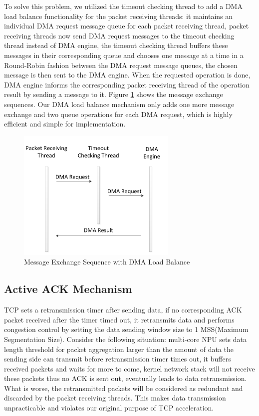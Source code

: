 \documentclass[conference]{IEEEtran}
\begin{document}
To solve this problem, we utilized the timeout checking thread to add a DMA load balance functionality for the packet receiving threads: it maintains an individual DMA request message queue for each packet receiving thread, packet receiving threads now send DMA request messages to the timeout checking thread instead of DMA engine, the timeout checking thread buffers these messages in their corresponding queue and chooses one message at a time in a Round-Robin fashion between the DMA request message queues, the chosen message is then sent to the DMA engine. When the requested operation is done, DMA engine informs the corresponding packet receiving thread of the operation result by sending a message to it. Figure \ref{dma balance seq} shows the message exchange sequences. Our DMA load balance mechanism only adds one more message exchange and two queue operations for each DMA request, which is highly efficient and simple for implementation.
\begin{figure}[!t]
\centering
\includegraphics[width=3.0in]{dma_balance_seq}
\caption{Message Exchange Sequence with DMA Load Balance}
\label{dma balance seq}
\end{figure}
\subsection{Active ACK Mechanism}
TCP sets a retransmission timer after sending data, if no corresponding ACK packet received after the timer timed out, it retransmits data and performs congestion control by setting the data sending window size to 1 MSS(Maximum Segmentation Size). Consider the following situation: multi-core NPU sets data length threshold for packet aggregation larger than the amount of data the sending side can transmit before retransmission timer times out, it buffers received packets and waits for more to come, kernel network stack will not receive these packets thus no ACK is sent out, eventually leads to data retransmission. What is worse, the retransmitted packets will be considered as redundant and discarded by the packet receiving threads. This makes data transmission unpracticable and violates our original purpose of TCP acceleration.
\end{document}
